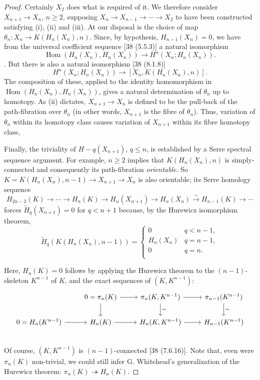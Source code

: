 \documentclass[openany,leqno]{book}  %
\newcommand{\Hom}{\mathop{\mathrm{Hom}}} %
\begin{document}
\begin{proof}
Certainly  $X_2$ does what is required of it. We therefore consider $X_{n+1} \rightarrow X_n$, $n \geqslant 2$, supposing $X_n \longrightarrow X_{n-1} \longrightarrow \cdots \longrightarrow X_2$ to have been constructed satisfying (i), (ii) and (iii). At our
disposal is the choice of map $\theta_n \colon   X_n \longrightarrow K(H_n(X_n), n)$. Since, by hypothesis, $H_{n-1}(X_n) = 0$, we have from the universal coefficient sequence [38 (5.5.3)] a natural isomorphism
\[\Hom(H_n(X_n),H_n(X_n))\longrightarrow H^n(X_n;H_n(X_n)).\]. 
But there is also a natural isomorphism [38 (8.1.8)] 
\[H^n(X_n;H_n(X_n))\longrightarrow [X_n,K(H_n(X_n), n)] .\]
The composition of these, applied to the identity homomorphism in $\Hom(H_n(X_n), H_n(X_n))$, gives a natural determination of $\theta_n$ up to homotopy. As (ii) dictates, $X_{n+1} \longrightarrow X_n$ is defined to be the pull-back of the path-fibration over $\theta_n$ (in other words, $X_{n+1}$ is the fibre of $\theta_n$). Thus, variation of $\theta_n$ within its homotopy class causes variation of $X_{n+1}$ within its fibre homotopy class,

Finally, the triviality of $H-q(X_{n+1})$, $q \leqslant n$, is established by a Serre spectral sequence argument. For example, $n \geqslant 2$ implies that $K(H_n(X_n), n)$ is simply-connected and consequently its path-fibration {\em orientable}. So $K = K(H_n(X_n), n-1) \longrightarrow X_{n+1} \longrightarrow X_n$ is also orientable; its Serre homology
sequence 
\[H_{2n-2}(K) \longrightarrow \cdots \longrightarrow H_n(K) \longrightarrow  H_n(X_{n+1}) \longrightarrow  H_n(X_n) \overset{\sim}{\longrightarrow}  H_{n-1}(K)\longrightarrow  \cdots\]
forces $\widetilde{H}_q (X_{n+1}) = 0$ for $q < n+1$ because, by the Hurewicz isomorphism theorem,
\begin{equation*}
\widetilde{H}_q(K(H_n(X_n),n-1))=
\begin{cases}
0 &q<n-1,\\
H_n(X_n)&q=n-1,\\
0 & q=n.\\
\end{cases}
\end{equation*}

Here, $H_n(K) = 0$ follows by applying the Hurewicz theorem to the $(n-1)$-skeleton $K^{n-1}$ of $K$, and the exact sequences of $(K, K^{n-1})$:
\[
\begin{tikzcd}
               &   0=\pi_{n}(K)  \arrow[r] \arrow[d] &   \pi_{n}(K,K^{n-1}) \arrow[r] \arrow[d,"\sim"] &  \pi_{n-1}(K^{n-1}) \arrow[d,"\sim"]  \\
  0=H_n(K^{n-1})  \arrow[r]  &  H_{n}(K)  \arrow[r]   &  H_{n}(K,K^{n-1})    \arrow[r] & H_{n-1}(K^{n-1})  \\
\end{tikzcd}
\]
Of course, $(K, K^{n-1})$ is $(n-1)$-connected [38 (7.6.16)]. Note that, even were $\pi_n(K)$ non-trivial, we could still infer G. Whitehead's generalization of the Hurewicz theorem: $\pi_n(K) \twoheadrightarrow H_n(K)$.
\end{proof}
\end{document}

